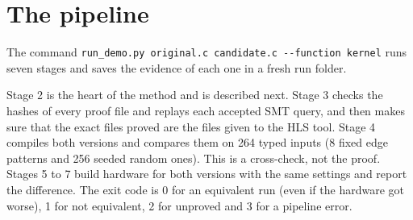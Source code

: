\documentclass[10pt,a4paper]{article}
\begin{document}
\section{The pipeline}
The command \texttt{run\_demo.py original.c candidate.c -{}-function kernel} runs seven stages and saves
the evidence of each one in a fresh run folder.
\begin{center}
\end{center}
Stage 2 is the heart of the method and is described next. Stage 3 checks the hashes of every proof
file and replays each accepted SMT query, and then makes sure that the exact files proved are the
files given to the HLS tool. Stage 4 compiles both versions and compares them on 264 typed inputs (8
fixed edge patterns and 256 seeded random ones). This is a cross-check, not the proof. Stages 5 to 7
build hardware for both versions with the same settings and report the difference. The exit code is
0 for an equivalent run (even if the hardware got worse), 1 for not equivalent, 2 for unproved and 3
for a pipeline error.
\end{document}
